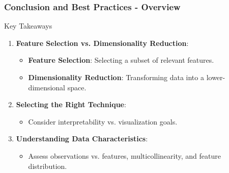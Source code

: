 \documentclass{beamer}
\begin{document}
\begin{frame}[fragile]
    \frametitle{Conclusion and Best Practices - Overview}
    \begin{block}{Key Takeaways}
        \begin{enumerate}
            \item \textbf{Feature Selection vs. Dimensionality Reduction}:
            \begin{itemize}
                \item \textbf{Feature Selection}: Selecting a subset of relevant features.
                \item \textbf{Dimensionality Reduction}: Transforming data into a lower-dimensional space.
            \end{itemize}
            
            \item \textbf{Selecting the Right Technique}:
            \begin{itemize}
                \item Consider interpretability vs. visualization goals.
            \end{itemize}
            
            \item \textbf{Understanding Data Characteristics}:
            \begin{itemize}
                \item Assess observations vs. features, multicollinearity, and feature distribution.
            \end{itemize}
        \end{enumerate}
    \end{block}
\end{frame}
\end{document}
